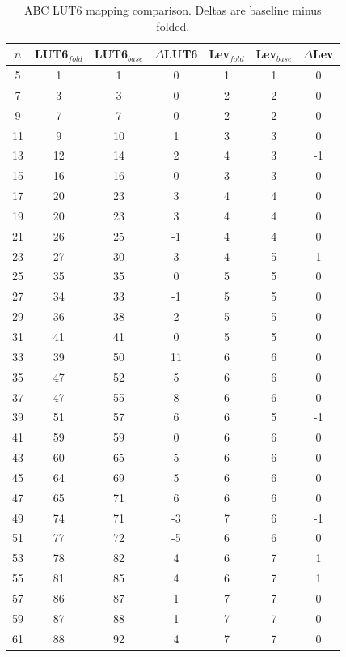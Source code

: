 \begin{table}[t]
\centering
\caption{ABC LUT6 mapping comparison. Deltas are baseline minus folded.}
\label{tab:lut6_map}
\begin{tabular}{ccccccc}
\hline
$n$ & LUT6$_{fold}$ & LUT6$_{base}$ & $\Delta$LUT6 & Lev$_{fold}$ & Lev$_{base}$ & $\Delta$Lev \\
\hline
5 & 1 & 1 & 0 & 1 & 1 & 0 \\
7 & 3 & 3 & 0 & 2 & 2 & 0 \\
9 & 7 & 7 & 0 & 2 & 2 & 0 \\
11 & 9 & 10 & 1 & 3 & 3 & 0 \\
13 & 12 & 14 & 2 & 4 & 3 & -1 \\
15 & 16 & 16 & 0 & 3 & 3 & 0 \\
17 & 20 & 23 & 3 & 4 & 4 & 0 \\
19 & 20 & 23 & 3 & 4 & 4 & 0 \\
21 & 26 & 25 & -1 & 4 & 4 & 0 \\
23 & 27 & 30 & 3 & 4 & 5 & 1 \\
25 & 35 & 35 & 0 & 5 & 5 & 0 \\
27 & 34 & 33 & -1 & 5 & 5 & 0 \\
29 & 36 & 38 & 2 & 5 & 5 & 0 \\
31 & 41 & 41 & 0 & 5 & 5 & 0 \\
33 & 39 & 50 & 11 & 6 & 6 & 0 \\
35 & 47 & 52 & 5 & 6 & 6 & 0 \\
37 & 47 & 55 & 8 & 6 & 6 & 0 \\
39 & 51 & 57 & 6 & 6 & 5 & -1 \\
41 & 59 & 59 & 0 & 6 & 6 & 0 \\
43 & 60 & 65 & 5 & 6 & 6 & 0 \\
45 & 64 & 69 & 5 & 6 & 6 & 0 \\
47 & 65 & 71 & 6 & 6 & 6 & 0 \\
49 & 74 & 71 & -3 & 7 & 6 & -1 \\
51 & 77 & 72 & -5 & 6 & 6 & 0 \\
53 & 78 & 82 & 4 & 6 & 7 & 1 \\
55 & 81 & 85 & 4 & 6 & 7 & 1 \\
57 & 86 & 87 & 1 & 7 & 7 & 0 \\
59 & 87 & 88 & 1 & 7 & 7 & 0 \\
61 & 88 & 92 & 4 & 7 & 7 & 0 \\
\hline
\end{tabular}
\end{table}
